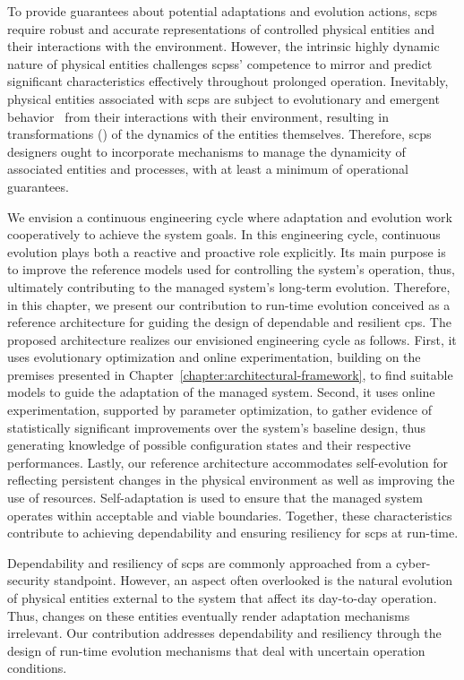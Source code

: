 To provide guarantees about potential adaptations and evolution actions, \gls{scps} require robust and accurate representations of controlled physical entities and their interactions with the environment. However, the intrinsic highly dynamic nature of physical entities challenges \glspl{scps}' competence to mirror and predict significant characteristics effectively throughout prolonged operation. Inevitably, physical entities associated with \gls{scps} are subject to evolutionary and emergent behavior~\cite{holland-2007-taxonomy} from their interactions with their environment, resulting in transformations () of the dynamics of the entities themselves. Therefore, \gls{scps} designers ought to incorporate mechanisms to manage the dynamicity of associated entities and processes, with at least a minimum of operational guarantees.

We envision a continuous engineering cycle where adaptation and evolution work cooperatively to achieve the system goals. In this engineering cycle, continuous evolution plays both a reactive and proactive role explicitly. Its main purpose is to improve the reference models used for controlling the system's operation, thus, ultimately contributing to the managed system's long-term evolution. Therefore, in this chapter, we present our contribution to run-time evolution conceived as a reference architecture for guiding the design of dependable and resilient \gls{cps}. The proposed architecture realizes our envisioned engineering cycle as follows. First, it uses evolutionary optimization and online experimentation, building on the premises presented in Chapter~\ref{chapter:architectural-framework}, to find suitable models to guide the adaptation of the managed system. Second, it uses online experimentation, supported by parameter optimization, to gather evidence of statistically significant improvements over the system's baseline design, thus generating knowledge of possible configuration states and their respective performances. Lastly, our reference architecture accommodates self-evolution for reflecting persistent changes in the physical environment as well as improving the use of resources. Self-adaptation is used to ensure that the managed system operates within acceptable and viable boundaries. Together, these characteristics contribute to achieving dependability and ensuring resiliency for \gls{scps} at run-time.

Dependability and resiliency of \gls{scps} are commonly approached from a cyber-security standpoint. However, an aspect often overlooked is the natural evolution of physical entities external to the system that affect its day-to-day operation. Thus, changes on these entities eventually render adaptation mechanisms irrelevant. Our contribution addresses dependability and resiliency through the design of run-time evolution mechanisms that deal with uncertain operation conditions.

